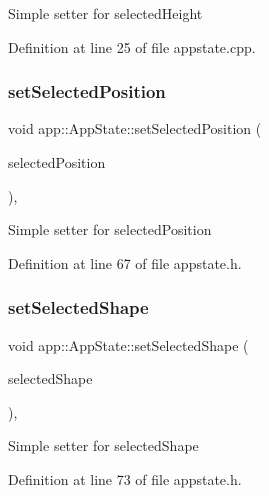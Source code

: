 Simple setter for selected\+Height 

Definition at line 25 of file appstate.\+cpp.

\mbox{\label{classapp_1_1_app_state_a2ce0da74b5c7c3e307f0b55ca6783c58}} 
\subsubsection{\texorpdfstring{set\+Selected\+Position}{setSelectedPosition}}
{\footnotesize\ttfamily void app\+::\+App\+State\+::set\+Selected\+Position (\begin{DoxyParamCaption}\item[{Q\+Point}]{selected\+Position }\end{DoxyParamCaption})\hspace{0.3cm}{\ttfamily [inline]}, {\ttfamily [slot]}}

Simple setter for selected\+Position 

Definition at line 67 of file appstate.\+h.

\mbox{\label{classapp_1_1_app_state_a14b1cf39be8be49f16baa526949fd564}} 
\subsubsection{\texorpdfstring{set\+Selected\+Shape}{setSelectedShape}}
{\footnotesize\ttfamily void app\+::\+App\+State\+::set\+Selected\+Shape (\begin{DoxyParamCaption}\item[{Q\+Abstract\+Graphics\+Shape\+Item $\ast$}]{selected\+Shape }\end{DoxyParamCaption})\hspace{0.3cm}{\ttfamily [inline]}, {\ttfamily [slot]}}

Simple setter for selected\+Shape 

Definition at line 73 of file appstate.\+h.

\mbox{\label{classapp_1_1_app_state_a65d839605a7f6926bc2d46534b20ec8c}} 
